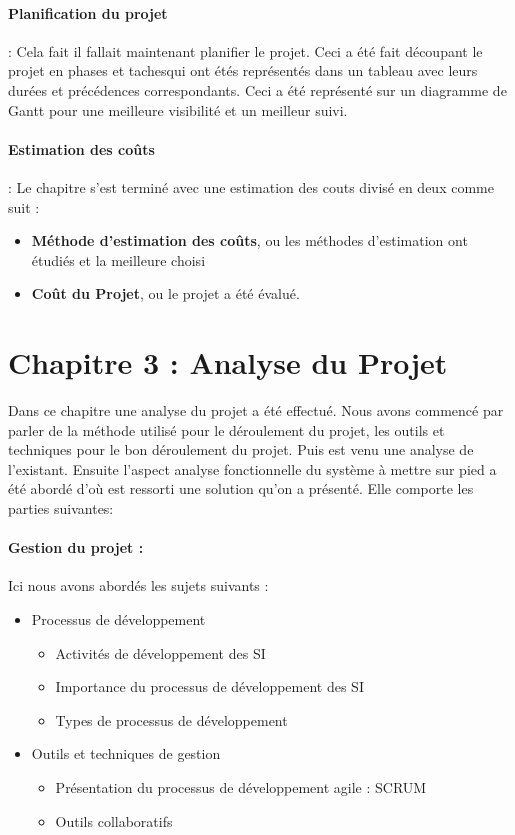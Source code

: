 \paragraph{Planification du projet} : Cela fait il fallait maintenant planifier le projet. Ceci a été fait découpant le projet en phases et tachesqui ont étés représentés dans un tableau avec leurs durées et précédences correspondants. Ceci a été représenté sur un diagramme de Gantt pour une meilleure visibilité et un meilleur suivi.

\paragraph{Estimation des coûts} : Le chapitre s'est terminé avec une estimation des couts divisé en deux comme suit :
\begin{itemize}
    \item \textbf{Méthode d’estimation des coûts}, ou les méthodes d'estimation ont étudiés et la meilleure choisi
    \item \textbf{Coût du Projet}, ou le projet a été évalué.
\end{itemize}


\section*{Chapitre 3 : Analyse du Projet}
Dans ce chapitre une analyse du projet a été effectué. Nous avons commencé par parler de la méthode utilisé pour le déroulement du projet, les outils et techniques pour le bon déroulement du projet. Puis est venu une analyse de l'existant. Ensuite l’aspect analyse fonctionnelle du système à mettre sur pied a été abordé d’où est ressorti une solution qu’on a présenté. Elle comporte les parties suivantes:
\paragraph{Gestion du projet :} Ici nous avons abordés les sujets suivants :
 \begin{itemize}
     \item Processus de développement
     \begin{itemize}
         \item Activités de développement des SI
         \item Importance du processus de développement des SI
         \item Types de processus de développement
     \end{itemize}
     \item Outils et techniques de gestion
     \begin{itemize}
         \item Présentation du processus de développement agile : SCRUM
         \item Outils collaboratifs
     \end{itemize}
 \end{itemize}

